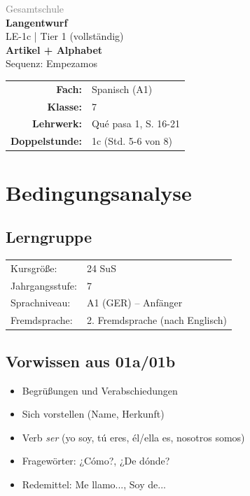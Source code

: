 \documentclass[11pt,a4paper]{article}
\newcommand{\fach}{Spanisch}
\newcommand{\jahrgangsstufe}{7}
\newcommand{\schulart}{Gesamtschule}
\newcommand{\stundenthema}{Artikel + Alphabet}
\newcommand{\reihenthema}{Empezamos}
\newcommand{\stundennummer}{1c}
\newcommand{\lehrwerk}{Qué pasa 1}
\newcommand{\lehrwerkseite}{S. 16-21}
\newcommand{\lerngruppengroesse}{24}
\begin{document}
\begin{titlepage}
    \centering
    \vspace*{2cm}
    {\large\textcolor{gray}{\schulart}}\\[2cm]
    {\Huge\textcolor{fach}{\textbf{Langentwurf}}}\\[0.5cm]
    {\large LE-\stundennummer{} | Tier 1 (vollständig)}\\[2cm]
    {\LARGE\textbf{\stundenthema}}\\[0.5cm]
    {\large Sequenz: \reihenthema}\\[2cm]
    \begin{tabular}{rl}
        \textbf{Fach:} & \fach{} (A1) \\[0.3cm]
        \textbf{Klasse:} & \jahrgangsstufe \\[0.3cm]
        \textbf{Lehrwerk:} & \lehrwerk, \lehrwerkseite \\[0.3cm]
        \textbf{Doppelstunde:} & \stundennummer{} (Std. 5-6 von 8) \\[0.3cm]
    \end{tabular}
    \vfill
\end{titlepage}

\tableofcontents
\newpage

\section{Bedingungsanalyse}

\subsection{Lerngruppe}
\begin{tabular}{ll}
    Kursgröße: & \lerngruppengroesse{} SuS \\
    Jahrgangsstufe: & \jahrgangsstufe \\
    Sprachniveau: & A1 (GER) -- Anfänger \\
    Fremdsprache: & 2. Fremdsprache (nach Englisch) \\
\end{tabular}

\subsection{Vorwissen aus 01a/01b}
\begin{itemize}
    \item Begrüßungen und Verabschiedungen
    \item Sich vorstellen (Name, Herkunft)
    \item Verb \textit{ser} (yo soy, tú eres, él/ella es, nosotros somos)
    \item Fragewörter: ¿Cómo?, ¿De dónde?
    \item Redemittel: Me llamo..., Soy de...
\end{itemize}
\end{document}
